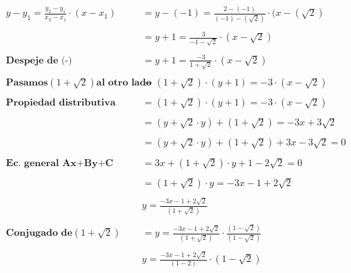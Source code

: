 \documentclass[12pt]{article}
\begin{document}
\newpage
\begin{equation}
    \begin{split}
       y-y_1=\frac{y_2-y_1}{x_2-x_1}\cdot (x-x_1) & =  y-(-1)=\frac{2-(-1)}{(-1)-(\sqrt{2})}\cdot (x-(\sqrt{2})\\\\
         & = y+1=\frac{3}{-1-\sqrt{2}}\cdot (x-\sqrt{2})\\\\ \textbf{Despeje de (-)}
        & = y+1=\frac{-3}{1+\sqrt{2}}\cdot (x-\sqrt{2})\\\\ \textbf{Pasamos} (1+\sqrt{2}) \textbf{al otro lado}
         & = (1+\sqrt{2}) \cdot (y+1)= -3\cdot (x-\sqrt{2})\\\\\textbf{Propiedad distributiva}
          & = (1+\sqrt{2}) \cdot (y+1)= -3\cdot (x-\sqrt{2})\\\\
            & = (y+\sqrt{2}\cdot y) + (1+\sqrt{2})= -3x+3\sqrt{2}\\\\
              & = (y+\sqrt{2}\cdot y) + (1+\sqrt{2}) +3x-3\sqrt{2} = 0\\\\ \textbf{Ec. general Ax+By+C}
                & = 3x+(1+\sqrt{2})\cdot y + 1-2\sqrt{2} = 0\\\\
                  & = (1+\sqrt{2})\cdot y =-3x - 1+2\sqrt{2} \\\\
                   & y =\frac{-3x - 1+2\sqrt{2}}{(1+\sqrt{2})} \\\\ \textbf{Conjugado de} (1+\sqrt{2})
                  & = y =\frac{-3x - 1+2\sqrt{2}}{(1+\sqrt{2})}\cdot \frac{(1-\sqrt{2})}{(1-\sqrt{2})}\\\\
                   & y =\frac{-3x - 1+2\sqrt{2}}{(1-2)}\cdot {(1-\sqrt{2})}\\\\
    \end{split}
\end{equation}

\newpage
\end{document}
